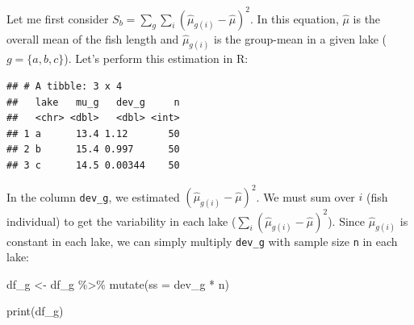 \documentclass[
]{article}
\newenvironment{Shaded}{\begin{snugshade}}{\end{snugshade}}
\newcommand{\AttributeTok}[1]{\textcolor[rgb]{0.77,0.63,0.00}{#1}}
\newcommand{\CommentTok}[1]{\textcolor[rgb]{0.56,0.35,0.01}{\textit{#1}}}
\newcommand{\DecValTok}[1]{\textcolor[rgb]{0.00,0.00,0.81}{#1}}
\newcommand{\FunctionTok}[1]{\textcolor[rgb]{0.00,0.00,0.00}{#1}}
\newcommand{\NormalTok}[1]{#1}
\newcommand{\OtherTok}[1]{\textcolor[rgb]{0.56,0.35,0.01}{#1}}
\newcommand{\SpecialCharTok}[1]{\textcolor[rgb]{0.00,0.00,0.00}{#1}}
\begin{document}
Let me first consider \(S_b = \sum_g \sum_i (\hat{\mu}_{g(i)} - \hat{\mu})^2\). In this equation, \(\hat{\mu}\) is the overall mean of the fish length and \(\hat{\mu}_{g(i)}\) is the group-mean in a given lake (\(g = \{a, b, c\}\)). Let's perform this estimation in R:

\begin{Shaded}
\end{Shaded}

\begin{verbatim}
## # A tibble: 3 x 4
##   lake   mu_g   dev_g     n
##   <chr> <dbl>   <dbl> <int>
## 1 a      13.4 1.12       50
## 2 b      15.4 0.997      50
## 3 c      14.5 0.00344    50
\end{verbatim}

In the column \texttt{dev\_g}, we estimated \((\hat{\mu}_{g(i)} - \hat{\mu})^2\). We must sum over \(i\) (fish individual) to get the variability in each lake (\(\sum_i (\hat{\mu}_{g(i)} - \hat{\mu})^2\)). Since \(\hat{\mu}_{g(i)}\) is constant in each lake, we can simply multiply \texttt{dev\_g} with sample size \texttt{n} in each lake:

\begin{Shaded}
\begin{Highlighting}[]
\NormalTok{df\_g }\OtherTok{\textless{}{-}}\NormalTok{ df\_g }\SpecialCharTok{\%\textgreater{}\%} 
  \FunctionTok{mutate}\NormalTok{(}\AttributeTok{ss =}\NormalTok{ dev\_g }\SpecialCharTok{*}\NormalTok{ n)}

\FunctionTok{print}\NormalTok{(df\_g)}
\end{Highlighting}
\end{Shaded}
\end{document}
